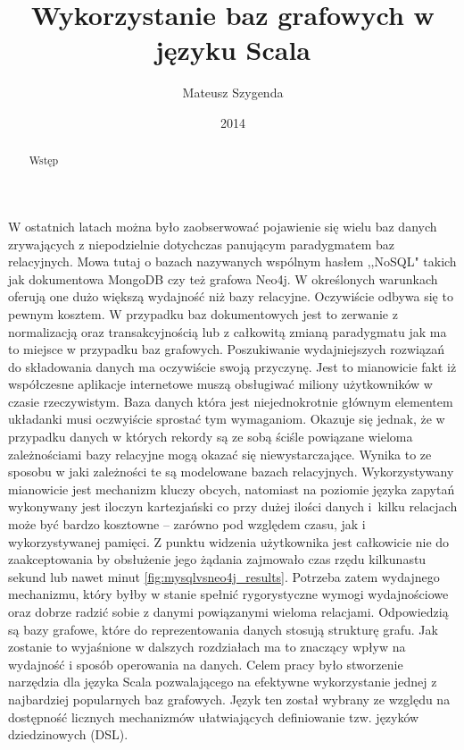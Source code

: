 \documentclass[brudnopis]{xmgr}
\author   {Mateusz Szygenda}
\title    {Wykorzystanie baz grafowych w języku Scala}
\date     {2014}
\begin{document}
\begin{abstract}
Wstęp
\end{abstract}

\maketitle

%
\introduction

W ostatnich latach można było zaobserwować pojawienie się wielu baz danych zrywających z niepodzielnie dotychczas panującym paradygmatem baz relacyjnych. Mowa tutaj o bazach nazywanych wspólnym hasłem ,,NoSQL" takich jak dokumentowa MongoDB czy też grafowa Neo4j. W określonych warunkach oferują one dużo większą wydajność niż bazy relacyjne. Oczywiście odbywa się to pewnym kosztem. W przypadku baz dokumentowych jest to zerwanie z normalizacją oraz transakcyjnością lub z całkowitą zmianą paradygmatu jak ma to miejsce w przypadku baz grafowych. Poszukiwanie wydajniejszych rozwiązań do składowania danych ma oczywiście swoją przyczynę. Jest to mianowicie fakt iż współczesne aplikacje internetowe muszą obsługiwać miliony użytkowników w czasie rzeczywistym. Baza danych która jest niejednokrotnie głównym elementem układanki musi oczwyiście sprostać tym wymaganiom. Okazuje się jednak, że w przypadku danych w których rekordy są ze sobą ściśle powiązane wieloma zależnościami bazy relacyjne mogą okazać się niewystarczające. Wynika to ze sposobu w jaki zależności te są modelowane bazach relacyjnych. Wykorzystywany mianowicie jest mechanizm kluczy obcych, natomiast na poziomie języka zapytań wykonywany jest iloczyn kartezjański co przy dużej ilości danych i~kilku relacjach może być bardzo kosztowne -- zarówno pod względem czasu, jak i wykorzystywanej pamięci. Z punktu widzenia użytkownika jest całkowicie nie do zaakceptowania by obsłużenie jego żądania zajmowało czas rzędu kilkunastu sekund lub nawet minut \ref{fig:mysqlvsneo4j_results}. Potrzeba zatem wydajnego mechanizmu, który byłby w stanie spełnić rygorystyczne wymogi wydajnościowe oraz dobrze radzić sobie z danymi powiązanymi wieloma relacjami. Odpowiedzią są bazy grafowe, które do reprezentowania danych stosują strukturę grafu. Jak zostanie to wyjaśnione  w dalszych rozdziałach ma to znaczący wpływ na wydajność i sposób operowania na danych. Celem pracy było stworzenie narzędzia dla języka Scala pozwalającego na efektywne wykorzystanie jednej z najbardziej popularnych baz grafowych. Język ten został wybrany ze względu na dostępność licznych mechanizmów ułatwiających definiowanie tzw. języków dziedzinowych (DSL).
\end{document}
